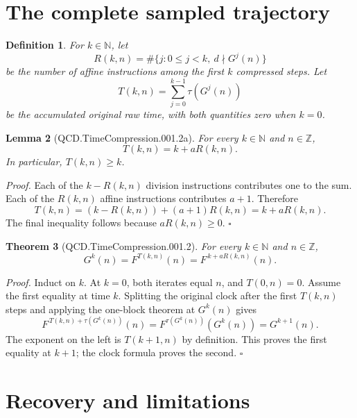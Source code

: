 \documentclass[11pt,letterpaper]{article}
\newcommand{\N}{\mathbb{N}}
\newcommand{\Z}{\mathbb{Z}}
\newtheorem{theorem}{Theorem}
\newtheorem{lemma}[theorem]{Lemma}
\newtheorem{definition}[theorem]{Definition}
\newenvironment{proof}{\noindent\textit{Proof.}}{\hfill\(\square\)}
\begin{document}
\section{The complete sampled trajectory}

\begin{definition}
For \(k\in\N\), let
\[
R(k,n)=\#\{j:0\le j<k,\ d\nmid G^j(n)\}
\]
be the number of affine instructions among the first \(k\) compressed steps.
Let
\[
T(k,n)=\sum_{j=0}^{k-1}\tau(G^j(n))
\]
be the accumulated original raw time, with both quantities zero when \(k=0\).
\end{definition}

\begin{lemma}[QCD.TimeCompression.001.2a]
For every \(k\in\N\) and \(n\in\Z\),
\[
T(k,n)=k+aR(k,n).
\]
In particular, \(T(k,n)\ge k\).
\end{lemma}
\begin{proof}
Each of the \(k-R(k,n)\) division instructions contributes one to the sum. Each
of the \(R(k,n)\) affine instructions contributes \(a+1\). Therefore
\[
T(k,n)=(k-R(k,n))+(a+1)R(k,n)=k+aR(k,n).
\]
The final inequality follows because \(aR(k,n)\ge0\).
\end{proof}

\begin{theorem}[QCD.TimeCompression.001.2]
For every \(k\in\N\) and \(n\in\Z\),
\[
G^k(n)=F^{T(k,n)}(n)=F^{\,k+aR(k,n)}(n).
\]
\end{theorem}
\begin{proof}
Induct on \(k\). At \(k=0\), both iterates equal \(n\), and \(T(0,n)=0\).
Assume the first equality at time \(k\). Splitting the original clock after the
first \(T(k,n)\) steps and applying the one-block theorem at \(G^k(n)\) gives
\[
F^{\,T(k,n)+\tau(G^k(n))}(n)
 =F^{\tau(G^k(n))}(G^k(n))
 =G^{k+1}(n).
\]
The exponent on the left is \(T(k+1,n)\) by definition. This proves the first
equality at \(k+1\); the clock formula proves the second.
\end{proof}

\section{Recovery and limitations}
\end{document}

